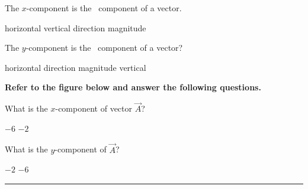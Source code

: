\documentclass{exam}
\begin{document}
\begin{questions}

\question
The $x$-component is the \fillin\ component of a vector.

\begin{choices}
    \correctchoice horizontal
    \choice vertical
    \choice direction
    \choice magnitude
\end{choices}

\question
The $y$-component is the \fillin\ component of a vector?

\begin{choices}
    \choice horizontal
    \choice direction
    \choice magnitude
    \correctchoice vertical
\end{choices}


\begin{EnvUplevel}
\textbf{Refer to the figure below and answer the following questions.}
\end{EnvUplevel}

\begin{figure}[h!]
    \centering
\def\Ax{2}
\def\Ay{6}
\end{figure}

\question
What is the $x$-component of vector $\vec{A}$?

\begin{choices}
    \choice $-6$
    \choice $-2$
\end{choices}

\question
What is the $y$-component of $\vec{A}$?

\begin{choices}
    \choice $-2$
    \choice $-6$
\end{choices}
\vspace{1em}
\hrule




\end{questions}
\end{document}
